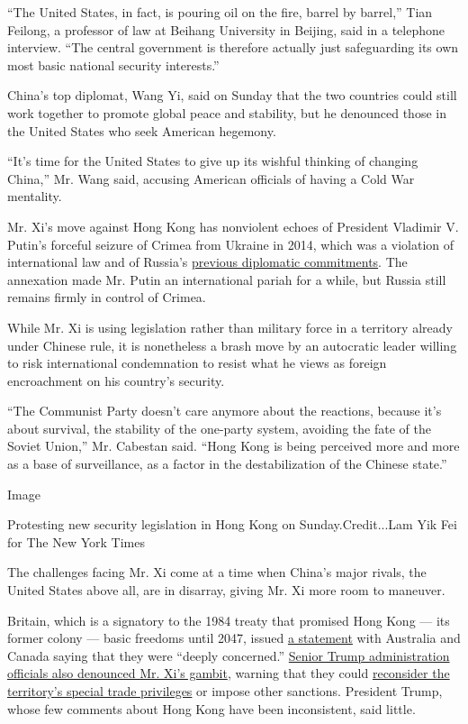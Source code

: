 ``The United States, in fact, is pouring oil on the fire, barrel by
barrel,'' Tian Feilong, a professor of law at Beihang University in
Beijing, said in a telephone interview. ``The central government is
therefore actually just safeguarding its own most basic national
security interests.''

China's top diplomat, Wang Yi, said on Sunday that the two countries
could still work together to promote global peace and stability, but he
denounced those in the United States who seek American hegemony.

``It's time for the United States to give up its wishful thinking of
changing China,'' Mr. Wang said, accusing American officials of having a
Cold War mentality.

Mr. Xi's move against Hong Kong has nonviolent echoes of President
Vladimir V. Putin's forceful seizure of Crimea from Ukraine in 2014,
which was a violation of international law and of Russia's
\href{https://www.nytimes3xbfgragh.onion/2015/02/21/world/europe/britain-europe-ukraine-house-of-lords-report.html}{previous
diplomatic commitments}. The annexation made Mr. Putin an international
pariah for a while, but Russia still remains firmly in control of
Crimea.

While Mr. Xi is using legislation rather than military force in a
territory already under Chinese rule, it is nonetheless a brash move by
an autocratic leader willing to risk international condemnation to
resist what he views as foreign encroachment on his country's security.

``The Communist Party doesn't care anymore about the reactions, because
it's about survival, the stability of the one-party system, avoiding the
fate of the Soviet Union,'' Mr. Cabestan said. ``Hong Kong is being
perceived more and more as a base of surveillance, as a factor in the
destabilization of the Chinese state.''

Image

Protesting new security legislation in Hong Kong on Sunday.Credit...Lam
Yik Fei for The New York Times

The challenges facing Mr. Xi come at a time when China's major rivals,
the United States above all, are in disarray, giving Mr. Xi more room to
maneuver.

Britain, which is a signatory to the 1984 treaty that promised Hong Kong
--- its former colony --- basic freedoms until 2047, issued
\href{https://www.gov.uk/government/news/joint-statement-from-the-uk-australia-and-canada-on-hong-kong}{a
statement} with Australia and Canada saying that they were ``deeply
concerned.''
\href{https://www.nytimes3xbfgragh.onion/2020/05/22/world/asia/trump-pompeo-china-hong-kong.html}{Senior
Trump administration officials also denounced Mr. Xi's gambit}, warning
that they could
\href{https://www.nytimes3xbfgragh.onion/2020/05/28/business/hong-kong-special-status-explained.html}{reconsider
the territory's special trade privileges} or impose other sanctions.
President Trump, whose few comments about Hong Kong have been
inconsistent, said little.

